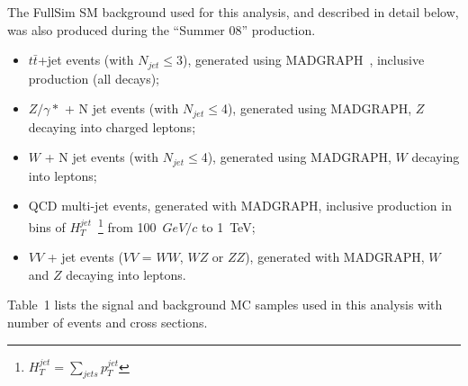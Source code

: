 \documentclass{cmspaper}
\begin{document}
\begin{linenumbers}
The FullSim SM background used for this analysis, and described in detail below,
was also produced during the ``Summer 08'' production.
\begin{itemize}
%
\item $t\bar{t}$+jet events (with $N_{jet}\le$3), generated using MADGRAPH~\cite{MADGRAPH}, inclusive production (all decays); 
%
\item $Z/\gamma*$ + N jet events (with $N_{jet}\le$4), generated using MADGRAPH, $Z$ decaying into charged leptons;  
%
\item $W$ + N jet events (with $N_{jet}\le$4), generated using MADGRAPH, $W$ decaying into leptons; 
%
\item QCD multi-jet events, generated with MADGRAPH, inclusive production in 
bins of $H_{T}^{jet}$~\footnote{$H_{T}^{jet}=\sum_{jets} p_T^{jet}$} from 100~$GeV/c$ to 1~TeV;  
%
%
\item $VV$ + jet events ($VV$ = $WW$, $WZ$ or $ZZ$), generated with MADGRAPH, 
$W$ and $Z$ decaying into leptons.
\end{itemize} 

Table~1
lists the signal and background MC samples used in this analysis with 
number of events and cross sections.


\end{linenumbers}
\end{document}
